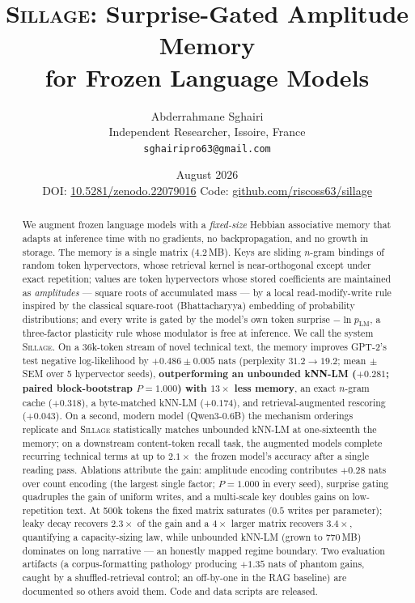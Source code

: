 \documentclass[11pt]{article}
\title{\bfseries \textsc{Sillage}: Surprise-Gated Amplitude Memory\\
for Frozen Language Models}
\author{Abderrahmane Sghairi\\
\small Independent Researcher, Issoire, France\\
\small \texttt{sghairipro63@gmail.com}}
\date{August 2026\\[2pt]
\small DOI: \href{https://doi.org/10.5281/zenodo.22079016}{10.5281/zenodo.22079016}
\qquad Code: \href{https://github.com/riscoss63/sillage}{github.com/riscoss63/sillage}}
\newcommand{\sillage}{\textsc{Sillage}}
\begin{document}
\maketitle

\begin{abstract}
We augment frozen language models with a \emph{fixed-size} Hebbian associative memory that adapts at inference time with no gradients, no backpropagation, and no growth in storage. The memory is a single matrix ($4.2$\,MB). Keys are sliding $n$-gram bindings of random token hypervectors, whose retrieval kernel is near-orthogonal except under exact repetition; values are token hypervectors whose stored coefficients are maintained as \emph{amplitudes} --- square roots of accumulated mass --- by a local read-modify-write rule inspired by the classical square-root (Bhattacharyya) embedding of probability distributions; and every write is gated by the model's own token surprise $-\ln p_{\mathrm{LM}}$, a three-factor plasticity rule whose modulator is free at inference. We call the system \sillage{}. On a 36k-token stream of novel technical text, the memory improves GPT-2's test negative log-likelihood by $+0.486 \pm 0.005$ nats (perplexity $31.2 \to 19.2$; mean$\,\pm\,$SEM over 5 hypervector seeds), \textbf{outperforming an unbounded kNN-LM ($+0.281$; paired block-bootstrap $P=1.000$) with $13\times$ less memory}, an exact $n$-gram cache ($+0.318$), a byte-matched kNN-LM ($+0.174$), and retrieval-augmented rescoring ($+0.043$). On a second, modern model (Qwen3-0.6B) the mechanism orderings replicate and \sillage{} statistically matches unbounded kNN-LM at one-sixteenth the memory; on a downstream content-token recall task, the augmented models complete recurring technical terms at up to $2.1\times$ the frozen model's accuracy after a single reading pass. Ablations attribute the gain: amplitude encoding contributes $+0.28$ nats over count encoding (the largest single factor; $P=1.000$ in every seed), surprise gating quadruples the gain of uniform writes, and a multi-scale key doubles gains on low-repetition text. At 500k tokens the fixed matrix saturates ($0.5$ writes per parameter); leaky decay recovers $2.3\times$ of the gain and a $4\times$ larger matrix recovers $3.4\times$, quantifying a capacity-sizing law, while unbounded kNN-LM (grown to 770\,MB) dominates on long narrative --- an honestly mapped regime boundary. Two evaluation artifacts (a corpus-formatting pathology producing $+1.35$ nats of phantom gains, caught by a shuffled-retrieval control; an off-by-one in the RAG baseline) are documented so others avoid them. Code and data scripts are released.
\end{abstract}
\end{document}

